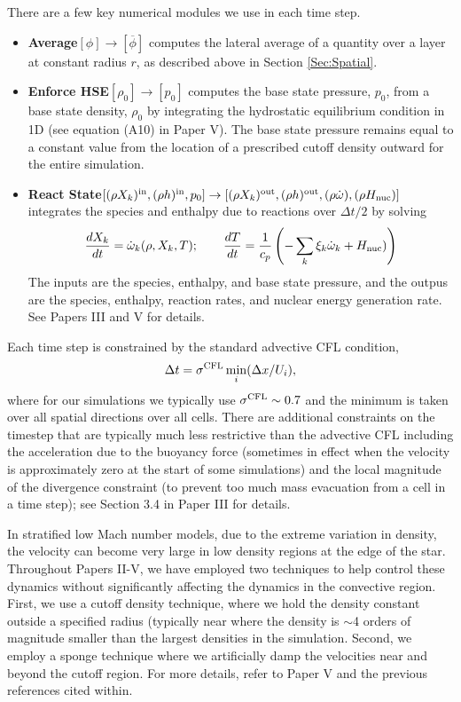 There are a few key numerical modules we use in each time step.
\begin{itemize}
\item {\bf Average}$[\phi]\rightarrow[\overline\phi]$ computes the lateral average of a quantity over a layer at constant radius $r$, as described above in Section \ref{Sec:Spatial}.
\item {\bf Enforce HSE}$[\rho_0]\rightarrow[p_0]$ computes the base state pressure, $p_0$, from a base state density, $\rho_0$ by integrating the hydrostatic equilibrium condition in 1D (see equation (A10) in Paper V).  The base state pressure remains equal to a constant value from the location of a prescribed cutoff density outward for the entire simulation.
\item {\bf React State}$[(\rho X_k)^{\rm in},(\rho h)^{\rm in},p_0]\rightarrow[(\rho X_k)^{\rm out},(\rho h)^{\rm out},(\rho\dot\omega),(\rho H_{\rm nuc})]$ integrates the species and enthalpy due to reactions over $\Delta t/2$ by solving
\begin{equation}
\frac{dX_k}{dt} = \dot\omega_k(\rho,X_k,T); \qquad
\frac{dT}{dt} = \frac{1}{c_p}\left(-\sum_k\xi_k\dot\omega_k + H_{\rm nuc})\right)
\end{equation}
The inputs are the species, enthalpy, and base state pressure, and the outpus are the species, enthalpy, reaction rates, and nuclear energy generation rate.
See Papers III and V for details.
\end{itemize}
Each time step is constrained by the standard advective CFL condition,
\begin{equation}
\Delta t = \sigma^{\rm CFL} \min_i(\Delta x / U_i),
\end{equation}
where for our simulations we typically use $\sigma^{\rm CFL}\sim 0.7$ and the minimum is taken over all spatial directions over all cells.
There are additional constraints on the timestep that are typically much less restrictive than the advective CFL including
the acceleration due to the buoyancy force (sometimes in effect when the velocity is approximately zero at the start of some simulations) 
and the local magnitude of the divergence constraint (to prevent too much mass evacuation from a cell in a time step); see Section 3.4 in Paper III for details.

In stratified low Mach number models, due to the extreme variation in density, the velocity can become very large in low density regions at the edge of the star.
Throughout Papers II-V, we have employed two techniques to help control these dynamics without significantly affecting the dynamics in the convective region.
First, we use a cutoff density technique, where we hold the density constant outside a specified radius (typically near where the density is $\sim$4 orders of magnitude smaller than the largest densities in the simulation.
Second, we employ a sponge technique where we artificially damp the velocities near and beyond the cutoff region.
For more details, refer to Paper V and the previous references cited within.


